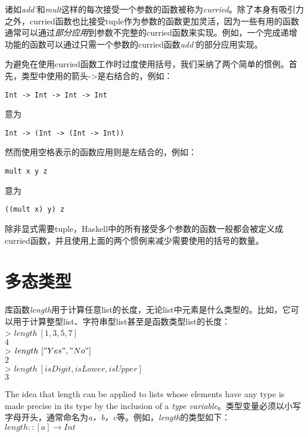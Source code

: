 诸如\textit{add'}和\textit{mult}这样的每次接受一个参数的函数被称为\textit{curried}。除了本身有吸引力之外，curried函数也比接受tuple作为参数的函数更加灵活，因为一些有用的函数通常可以通过\textit{部分应用}到参数不完整的curried函数来实现。例如，一个完成递增功能的函数可以通过只需一个参数的curried函数\textit{add'}的部分应用实现。

为避免在使用curried函数工作时过度使用括号，我们采纳了两个简单的惯例。首先，类型中使用的箭头->是右结合的，例如：

\begin{verbatim}
Int -> Int -> Int -> Int
\end{verbatim}
意为
\begin{verbatim}
Int -> (Int -> (Int -> Int))
\end{verbatim}

然而使用空格表示的函数应用则是左结合的，例如：
\begin{verbatim}
mult x y z
\end{verbatim}
意为
\begin{verbatim}
((mult x) y) z
\end{verbatim}

除非显式需要tuple，Haskell中的所有接受多个参数的函数一般都会被定义成curried函数，并且使用上面的两个惯例来减少需要使用的括号的数量。

\section{多态类型}
库函数\textit{length}用于计算任意list的长度，无论list中元素是什么类型的。比如，它可以用于计算整型list、字符串型list甚至是函数类型list的长度：\\
\hspace*{1cm} > $length~[1, 3, 5, 7]$\\
\hspace*{1cm} $4$\\
\hspace*{1cm} > $length~["Yes", "No"]$\\
\hspace*{1cm} $2$\\
\hspace*{1cm} > $length~[isDigit , isLower , isUpper]$\\
\hspace*{1cm} $3$

The idea that length can be applied to lists whose elements have any type is
made precise in its type by the inclusion of a \textit{type
variable}。类型变量必须以小写字母开头，通常命名为\textit{a，b，c}等。例如，\textit{length}的类型如下：\\
\hspace*{1cm} $length :: [a] \rightarrow Int$

